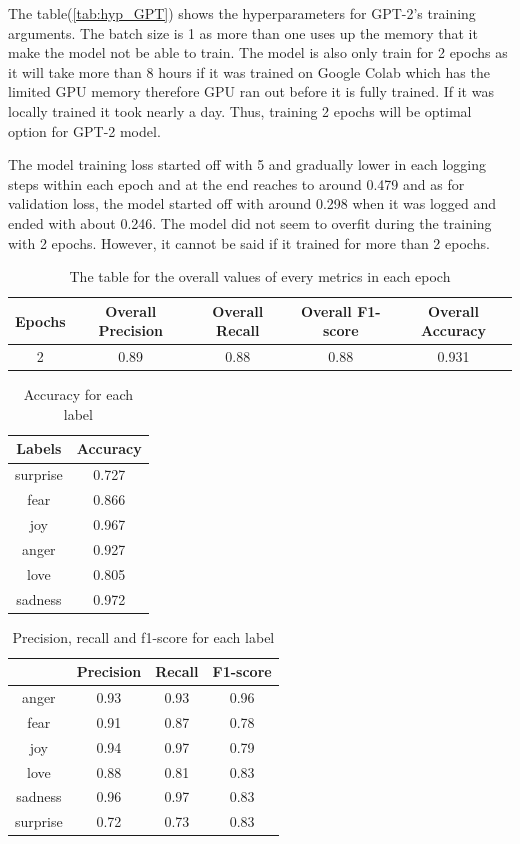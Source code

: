 The table(\ref{tab:hyp_GPT}) shows the hyperparameters for GPT-2's training arguments. The batch size is 1 as more than one uses up the memory that it make the model not be able to train. The model is also only train for 2 epochs as it will take more than 8 hours if it was trained on Google Colab which has the limited GPU memory therefore GPU ran out before it is fully trained. If it was locally trained it took nearly a day. Thus, training 2 epochs will be optimal option for GPT-2 model. 

The model training loss started off with 5 and gradually lower in each logging steps within each epoch and at the end reaches to around 0.479 and as for validation loss, the model started off with around 0.298 when it was logged and ended with about 0.246. The model did not seem to overfit during the training with 2 epochs. However, it cannot be said if it trained for more than 2 epochs.

\begin{table}[h!]
    \centering
    \begin{tabular}{|c|c|c|c|c|}\hline
          Epochs  & Overall Precision & Overall Recall & Overall F1-score & Overall Accuracy\\\hline
           2 & 0.89 & 0.88 & 0.88 & 0.931\\\hline
    \end{tabular}
    \caption{The table for the overall values of every metrics in each epoch}
    \label{tab:overall_metrics_gpt2}
\end{table}

\begin{table}[h!]
    \centering
    \begin{tabular}{c|c}
       Labels  & Accuracy\\\hline
        surprise & 0.727\\
        fear & 0.866\\
        joy & 0.967\\
        anger & 0.927\\
        love & 0.805\\
        sadness & 0.972\\
    \end{tabular}
    \caption{Accuracy for each label}
    \label{tab:acc_each_labels}
\end{table}

\begin{table}[h!]
    \centering
    \begin{tabular}{c|c|c|c}
         & Precision & Recall & F1-score\\\hline
         anger & 0.93 & 0.93 & 0.96 \\
         fear & 0.91 & 0.87 &  0.78 \\
         joy & 0.94 & 0.97 & 0.79 \\
         love & 0.88 & 0.81 & 0.83\\
         sadness & 0.96 & 0.97 & 0.83\\
         surprise & 0.72 & 0.73 & 0.83\\
    \end{tabular}
    \caption{Precision, recall and f1-score for each label}
    \label{tab:class_rep_gpt2}
\end{table}

